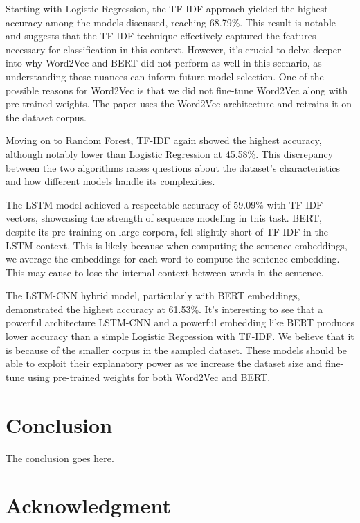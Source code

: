 \documentclass[conference]{IEEEtran}
\begin{document}
Starting with Logistic Regression, the TF-IDF approach yielded the highest accuracy among the models discussed, reaching 68.79\%. This result is notable and suggests that the TF-IDF technique effectively captured the features necessary for classification in this context. However, it's crucial to delve deeper into why Word2Vec and BERT did not perform as well in this scenario, as understanding these nuances can inform future model selection. One of the possible reasons for Word2Vec is that we did not fine-tune Word2Vec along with pre-trained weights. The paper uses the Word2Vec architecture and retrains it on the dataset corpus. 

Moving on to Random Forest, TF-IDF again showed the highest accuracy, although notably lower than Logistic Regression at 45.58\%. This discrepancy between the two algorithms raises questions about the dataset's characteristics and how different models handle its complexities.

The LSTM model achieved a respectable accuracy of 59.09\% with TF-IDF vectors, showcasing the strength of sequence modeling in this task. BERT, despite its pre-training on large corpora, fell slightly short of TF-IDF in the LSTM context. This is likely because when computing the sentence embeddings, we average the embeddings for each word to compute the sentence embedding. This may cause to lose the internal context between words in the sentence.

The LSTM-CNN hybrid model, particularly with BERT embeddings, demonstrated the highest accuracy at 61.53\%. It's interesting to see that a powerful architecture LSTM-CNN and a powerful embedding like BERT produces lower accuracy than a simple Logistic Regression with TF-IDF. We believe that it is because of the smaller corpus in the sampled dataset. These models should be able to exploit their explanatory power as we increase the dataset size and fine-tune using pre-trained weights for both Word2Vec and BERT.

\section{Conclusion}
The conclusion goes here.






\section*{Acknowledgment}
\end{document}
